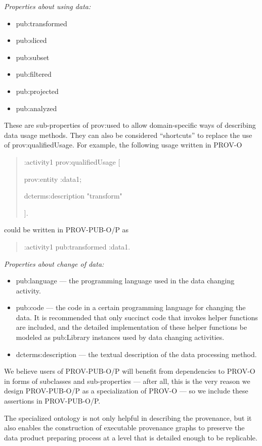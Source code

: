 \hspace{-1em}\emph{Properties about using data:}
\begin{itemize}
	\item pub:transformed
	\item pub:sliced
	\item pub:subset
	\item pub:filtered
	\item pub:projected
	\item pub:analyzed
\end{itemize}
These are sub-properties of prov:used to allow domain-specific ways of describing data usage methods. They can also be considered ``shortcuts'' to replace the use of prov:qualifiedUsage. For example, the following usage written in PROV-O
\begin{quotation}
:activity1 prov:qualifiedUsage [

  \hspace{2em}prov:entity :data1;
  
  \hspace{2em}dcterms:description "transform"

].
\end{quotation}
could be written in PROV-PUB-O/P as
\begin{quotation}
:activity1 pub:transformed :data1.
\end{quotation}
\hspace{-1em}\emph{Properties about change of data:}
\begin{itemize}
	\item pub:language --- the programming language used in the data changing activity.
	\item pub:code --- the code in a certain programming language for changing the data. It is recommended that only succinct code that invokes helper functions are included, and the detailed implementation of these helper functions be modeled as pub:Library instances used by data changing activities.
	\item dcterms:description --- the textual description of the data processing method. 
\end{itemize}

We believe users of PROV-PUB-O/P will benefit from dependencies to PROV-O in forms of subclasses and sub-properties --- after all, this is the very reason we design PROV-PUB-O/P as a specialization of PROV-O --- so we include these assertions in PROV-PUB-O/P.

The specialized ontology is not only helpful in describing the provenance, but it also enables the construction of executable provenance graphs to preserve the data product preparing process at a level that is detailed enough to be replicable.

